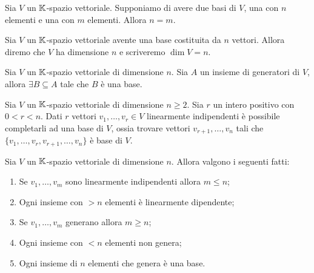 \begin{thm}
        Sia $ V $ un $ \mathbb{K} $-spazio vettoriale. Supponiamo di avere due basi di $ V $, una con $ n $ elementi e una con $ m $ elementi. Allora $ n = m $.
\end{thm}

\begin{definition}[Dimensione]
	Sia $ V $ un $ \mathbb{K} $-spazio vettoriale avente una base costituita da $ n $ vettori. Allora diremo che $ V $ ha dimensione $ n $ e 
	scriveremo $ \dim{V} = n $.
\end{definition}

\begin{thm} 
	Sia $ V $ un $ \mathbb{K} $-spazio vettoriale di dimensione $ n $. Sia $A$ un insieme di generatori di $V$, allora $\exists B \subseteq A$ tale che $B$ è una base.
\end{thm}

\begin{thm}
        Sia $ V $ un $ \mathbb{K} $-spazio vettoriale di dimensione $ n \geq 2 $. Sia $ r $ un intero positivo con $ 0 < r < n $. 
        Dati $ r $ vettori $ v_1, \ldots , v_r \in V $ linearmente indipendenti è possibile completarli ad una base di $ V $, 
        ossia trovare vettori $ v_{r+1}, \ldots, v_n $ tali che $ \{v_1, \ldots , v_r, v_{r+1}, \ldots , v_n\} $ è base di $ V $.
\end{thm}

\begin{prop}
	Sia $ V $ un $ \mathbb{K} $-spazio vettoriale di dimensione $ n $. Allora valgono i seguenti fatti:
	\begin{enumerate}[label=(\roman*)]
                \item Se $ v_1, \ldots, v_m $ sono linearmente indipendenti allora $m \le n$;
                \item Ogni insieme con $>n$ elementi è linearmente dipendente;
                \item Se $ v_1, \ldots, v_m $ generano allora $m \ge n$;
		\item Ogni insieme con $<n$ elementi non genera;
		\item Ogni insieme di $n$ elementi che genera è una base.
        \end{enumerate}
\end{prop}


